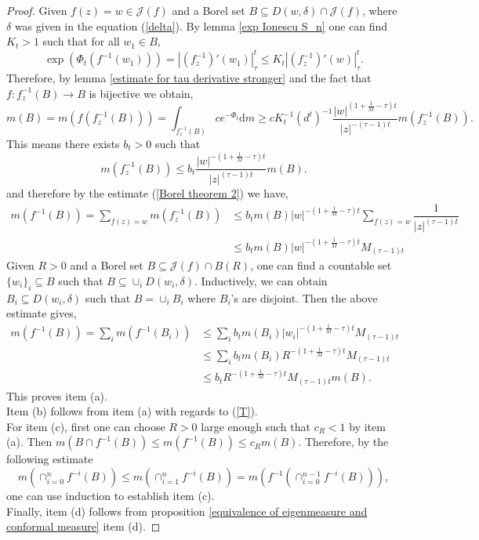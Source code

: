 \documentclass[10pt,a4paper]{amsart}
\begin{document}
\begin{proof}
     Given $f(z)=w\in \mathcal{J}(f)$ and a Borel set $B\subseteq D(w,\delta) \cap \mathcal{J}(f)$, where $\delta$ was given in the equation (\ref{delta}). By lemma \ref{exp Ionescu S_n} one can find $K_t>1$ such that for all $w_1\in B,$
     $$\exp\left(\Phi_t\left(f^{-1}(w_1)\right)\right)=\left|(f_z^{-1})'(w_1)\right|_{\tau}^{t}\leq K_t \left|(f_z^{-1})'(w)\right|_{\tau}^{t}.$$
     Therefore, by lemma \ref{estimate for tau derivative stronger} and the fact that $f: f^{-1}_z(B) \to B$ is bijective we obtain,
     $$m(B)=m(f(f^{-1}_z(B)))=\int_{f_z^{-1}(B)}ce^{-\Phi_t}\text{d}m \geq cK_t^{-1}(d^{t})^{-1}\dfrac{|w|^{(1+\frac{1}{M}-\tau)t}}{|z|^{-(\tau-1)t}} m(f_z^{-1}(B)).$$
     This means there exists $b_t>0$ such that 
     $$m(f_z^{-1}(B)) \leq b_t \dfrac{|w|^{-(1+\frac{1}{M}-\tau)t}}{|z|^{(\tau-1)t}} m(B).$$
     and therefore by the estimate (\ref{Borel theorem 2}) we have,
     \begin{align*}
         m(f^{-1}(B))=\sum_{f(z)=w}m(f_z^{-1}(B)) &\leq b_tm(B)|w|^{-(1+\frac{1}{M}-\tau)t}\sum_{f(z)=w}\dfrac{1}{|z|^{(\tau-1)t}}\\
         &\leq  b_tm(B)|w|^{-(1+\frac{1}{M}-\tau)t} M_{(\tau-1)t}
     \end{align*}
     Given $R>0$ and a Borel set $B\subseteq \mathcal{J}(f) \cap B(R)$, one can find a countable set $\{w_i\}_i \subseteq B$ such that 
     $B \subseteq \cup_i D(w_i,\delta)$. Inductively, we can obtain $B_i\subseteq D(w_i,\delta)$ such that $B=\cup_i B_i$ where $B_{i}$'s are disjoint. Then the above estimate gives,
     \begin{align*}
    m\left(f^{-1}(B)\right) = \sum_i m\left(f^{-1}(B_{i})\right) &\leq \sum_i b_t m(B_i)|w_{i}|^{-(1+\frac{1}{M}-\tau)t}M_{(\tau-1)t}\\
    & \leq \sum_i b_tm(B_i)R^{-(1+\frac{1}{M}-\tau)t}M_{(\tau-1)t}\\
    & \leq b_tR^{-(1+\frac{1}{M}-\tau)t}M_{(\tau-1)t}m(B).
     \end{align*}
     This proves item (a).\\
     Item (b) follows from item (a) with regards to (\ref{T}).\\
     For item (c), first one can choose $R>0$ large enough such that $c_R<1$ by item (a). Then $m(B\cap f^{-1}(B))\leq m(f^{-1}(B))\leq c_Rm(B)$. Therefore, by the following estimate
     $$m\left( \cap_{i=0}^nf^{-i}(B)\right) \leq m\left( \cap_{i=1}^nf^{-i}(B)\right)=m\left( f^{-1}\left(\cap_{i=0}^{n-1}f^{-i}(B)\right)\right),$$
     one can use induction to establish item (c).\\
     Finally, item (d) follows from proposition \ref{equivalence of eigenmeasure and conformal measure} item (d).
\end{proof}
\end{document}
